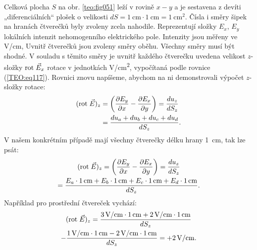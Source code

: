 \begin{mdframed}[style=mdexam]
\begin{example}\label{TEO:exam014}
  Celková plocha \(S\) na obr. \ref{teo:fig051} leží v rovině \(x-y\) a je 
  sestavena z devíti „diferenciálních“ plošek o velikosti \(dS = \SI{1}{\cm} \cdot \SI{1}{\cm} = 
  \SI{1}{\cm^2}\). Čísla i směry šipek na hranách čtverečků byly zvoleny zcela nahodile. 
  Reprezentují složky \(E_x\), \(E_y\) lokálních intenzit nehomogenního elektrického pole. 
  Intenzity jsou měřeny ve \si{V/\cm}, Uvnitř čtverečků jsou zvoleny směry oběhu. Všechny směry 
  musí být shodné. V souladu s těmito směry je uvnitř každého čtverečku uvedena velikost 
  \(z\)-složky \(\mathrm{rot}\;\vec{E}_x\) rotace v jednotkách \si{V/\cm^2}, vypočítaná podle rovnice 
  (\ref{TEO:eq117}). Rovnici znovu napíšeme, abychom na ni demonstrovali výpočet 
  \(z\)-složky rotace:
  \begin{align*}
    (\mathrm{rot}\;\vec{E})_z   &= \left(\dfrac{\partial E_y}{\partial x} - \dfrac{\partial E_x}{\partial y}\right)                  
                  = \frac{du_z}{dS_z}                             \\
                  &= \frac{du_a + du_b + du_c + du_d}{dS_z}.
  \end{align*}
  V našem konkrétním případě mají všechny čtverečky délku hrany \SI{1}{\cm}, tak lze psát:
  \begin{multline*}
    (\rot{E})_z = \left(\pder{E_y}{x} - \pder{E_x}{y}\right)
                = \frac{du_z}{dS_z}                                          \\
                = \frac{E_a\cdot\SI{1}{\cm} + E_b\cdot\SI{1}{\cm} + 
                    E_c\cdot\SI{1}{\cm} + E_d\cdot\SI{1}{\cm}}{dS_z}.
  \end{multline*}
  Například pro prostřední čtvereček vychází:
  \begin{multline*}
    (\rot{E})_z 
      = \frac{\SI{3}{V/\cm}\cdot\SI{1}{\cm} + \SI{2}{V/\cm}\cdot\SI{1}{\cm}}{dS_z}  \\
      - \frac{\SI{1}{V/\cm}\cdot\SI{1}{\cm} - \SI{2}{V/\cm}\cdot\SI{1}{\cm}}{dS_z} 
      = + \SI{2}{V/\cm}.
  \end{multline*}
  
   {\centering
    \captionsetup{type=figure}
    \label{teo:fig051}
  \par}
  

\end{example}
\end{mdframed}
